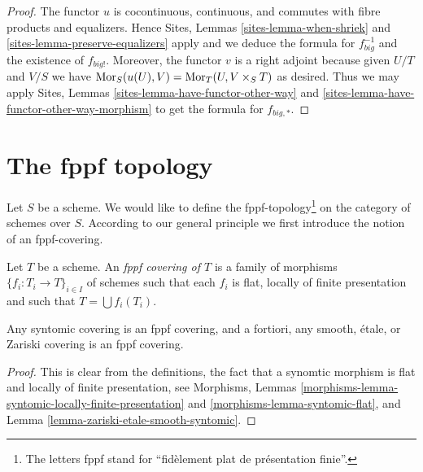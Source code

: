\begin{proof}
The functor $u$ is cocontinuous, continuous, and commutes with fibre products
and equalizers. Hence
Sites, Lemmas \ref{sites-lemma-when-shriek} and
\ref{sites-lemma-preserve-equalizers}
apply and we deduce the formula
for $f_{big}^{-1}$ and the existence of $f_{big!}$. Moreover,
the functor $v$ is a right adjoint because given $U/T$ and $V/S$
we have $\mathop{\rm Mor}\nolimits_S(u(U), V) = \mathop{\rm Mor}\nolimits_T(U, V \times_S T)$
as desired. Thus we may apply
Sites, Lemmas \ref{sites-lemma-have-functor-other-way} and
\ref{sites-lemma-have-functor-other-way-morphism} to get the
formula for $f_{big, *}$.
\end{proof}













\section{The fppf topology}
\label{section-fppf}

\noindent
Let $S$ be a scheme. We would like to define the fppf-topology\footnote{
The letters fppf stand for ``fid\`element plat de pr\'esentation finie''.} on
the category of schemes over $S$. According to our general principle
we first introduce the notion of an fppf-covering.

\begin{definition}
\label{definition-fppf-covering}
Let $T$ be a scheme. An {\it fppf covering of $T$} is a family
of morphisms $\{f_i : T_i \to T\}_{i \in I}$ of schemes
such that each $f_i$ is flat, locally of finite presentation and such
that $T = \bigcup f_i(T_i)$.
\end{definition}

\begin{lemma}
\label{lemma-zariski-etale-smooth-syntomic-fppf}
Any syntomic covering is an fppf covering, and a fortiori,
any smooth, \'etale, or Zariski covering is an fppf covering.
\end{lemma}

\begin{proof}
This is clear from the definitions, the fact that a synomtic morphism
is flat and locally of finite presentation, see
Morphisms, Lemmas
\ref{morphisms-lemma-syntomic-locally-finite-presentation} and
\ref{morphisms-lemma-syntomic-flat},
and
Lemma \ref{lemma-zariski-etale-smooth-syntomic}.
\end{proof}

